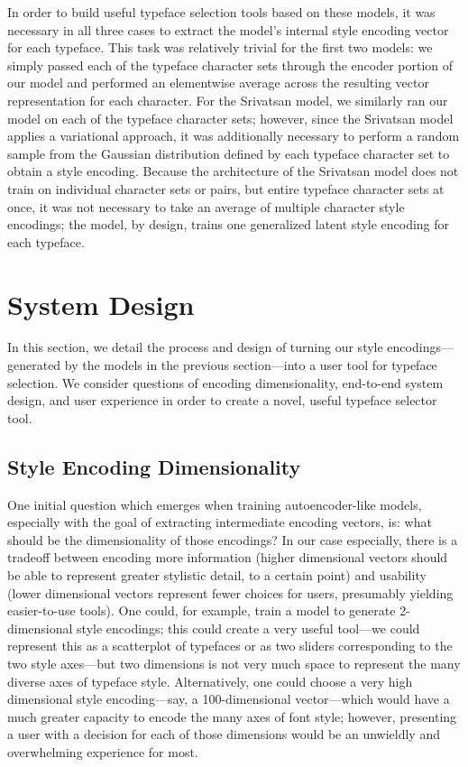 In order to build useful typeface selection tools based on these models, it was necessary in all three cases to extract the model's internal style encoding vector for each typeface. This task was relatively trivial for the first two models: we simply passed each of the typeface character sets through the encoder portion of our model and performed an elementwise average across the resulting vector representation for each character. For the Srivatsan model, we similarly ran our model on each of the typeface character sets; however, since the Srivatsan model applies a variational approach, it was additionally necessary to perform a random sample from the Gaussian distribution defined by each typeface character set to obtain a style encoding. Because the architecture of the Srivatsan model does not train on individual character sets or pairs, but entire typeface character sets at once, it was not necessary to take an average of multiple character style encodings; the model, by design, trains one generalized latent style encoding for each typeface.

\section{System Design}

In this section, we detail the process and design of turning our style encodings—generated by the models in the previous section—into a user tool for typeface selection. We consider questions of encoding dimensionality, end-to-end system design, and user experience in order to create a novel, useful typeface selector tool.

\subsection{Style Encoding Dimensionality}

One initial question which emerges when training autoencoder-like models, especially with the goal of extracting intermediate encoding vectors, is: what should be the dimensionality of those encodings? In our case especially, there is a tradeoff between encoding more information (higher dimensional vectors should be able to represent greater stylistic detail, to a certain point) and usability (lower dimensional vectors represent fewer choices for users, presumably yielding easier-to-use tools). One could, for example, train a model to generate 2-dimensional style encodings; this could create a very useful tool—we could represent this as a scatterplot of typefaces or as two sliders corresponding to the two style axes—but two dimensions is not very much space to represent the many diverse axes of typeface style. Alternatively, one could choose a very high dimensional style encoding—say, a 100-dimensional vector—which would have a much greater capacity to encode the many axes of font style; however, presenting a user with a decision for each of those dimensions would be an unwieldly and overwhelming experience for most.

